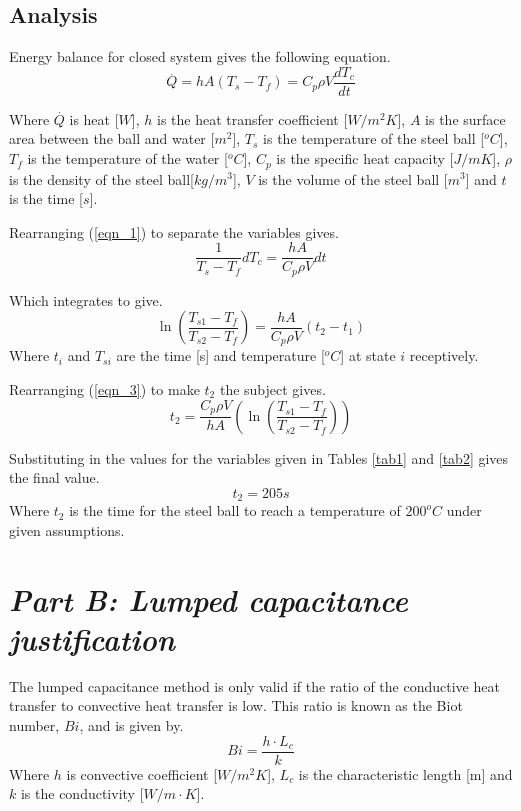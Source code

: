\documentclass[11pt]{article}
\begin{document}
\subsection{Analysis}

Energy balance for closed system gives the following equation.
\begin{equation}\label{eqn_1}
	\stackrel{.}{Q} = hA(T_{s}-T_{f}) = C_{p}\rho V \frac{dT_{c}}{dt}
\end{equation}

Where $\stackrel{.}{Q}$ is heat [$W$], $h$ is the heat transfer coefficient [$W/m^{2}K$], $A$ is the surface area between the ball and water [$m^{2}$], $T_{s}$ is the temperature of the steel ball [$^{o}C$], $T_{f}$ is the temperature of the water [$^{o}C$], $C_{p}$ is the specific heat capacity [$J/mK$], $\rho$ is the density of the steel ball[$kg/m^{3}$], $V$ is the volume of the steel ball [$m^3$] and $t$ is the time [$s$].
\newline

Rearranging (\ref{eqn_1}) to separate the variables gives.
\begin{equation}\label{key}
	\frac{1}{T_{s}-T_{f}} dT_{c} = \frac{hA}{C_{p}\rho V}dt
\end{equation}

Which integrates to give.
\begin{equation}\label{eqn_3}
	\ln{(\frac{T_{s1}-T_{f}}{T_{s2}-T_{f}})} =  \frac{hA}{C_{p}\rho V}(t_{2}-t_{1})
\end{equation}
Where $t_{i}$ and $T_{si}$ are the time [s] and temperature [$^oC$] at state $i$ receptively.

Rearranging (\ref{eqn_3}) to make $t_{2}$ the subject gives.
\begin{equation}\label{key}
	t_{2} = \frac{C_{p}\rho V}{hA}(\ln{(\frac{T_{s1}-T_{f}}{T_{s2}-T_{f}})})
\end{equation}

Substituting in the values for the variables given in Tables \ref{tab1} and \ref{tab2} gives the final value.
\boldmath
\begin{equation}\label{t1}
	t_2 = 205 s
\end{equation}
\unboldmath
Where $t_2$ is the time for the steel ball to reach a temperature of $200^{o}C$ under given assumptions.

\section{\emph{Part B: Lumped capacitance justification}}
The lumped capacitance method is only valid if the ratio of the conductive heat transfer to convective heat transfer is low. This ratio is known as the Biot number, $Bi$, and is given by.
\begin{equation}\label{eqn_biot}
	Bi = \frac{h \cdot L_{c}}{k}
\end{equation}
Where $h$ is convective coefficient [$W/m^{2}K$], $L_{c}$ is the characteristic length [m] and $k$ is the conductivity [$W/m \cdot K$]. 
\end{document}
